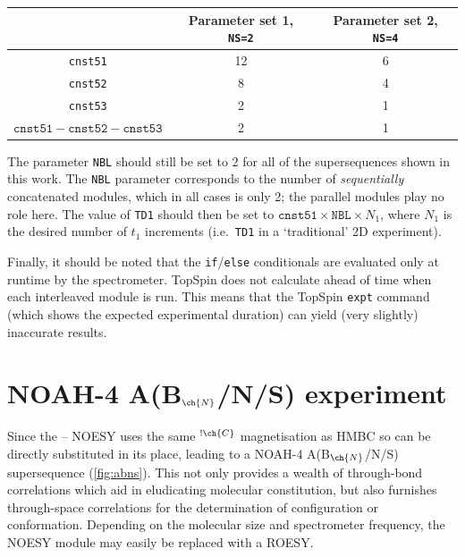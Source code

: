 \documentclass[a4paper,12pt]{article}
\newcommand{\proton}{\ch{^{1}H}}
\newcommand{\carbon}{\ch{^{13}C}}
\newcommand{\magnnot}[1]{\ch{^1H}$^{!#1}$}
\newcommand{\abnns}{NOAH-4 A(B$_{\ch{N}}$/N/S)}
\begin{document}
\begin{refsection}
\begin{table}[H]
    \centering
    \begin{tabular}{ccc}
        \toprule
         & Parameter set 1, \texttt{NS=2} & Parameter set 2, \texttt{NS=4} \\
        \midrule
        \texttt{cnst51} & 12 & 6 \\
        \texttt{cnst52} & 8  & 4 \\
        \texttt{cnst53} & 2  & 1 \\
        $\texttt{cnst51} - \texttt{cnst52} - \texttt{cnst53}$ & 2  & 1 \\
        \bottomrule
    \end{tabular}
\end{table}

The parameter \texttt{NBL} should still be set to 2 for all of the supersequences shown in this work.
The \texttt{NBL} parameter corresponds to the number of \textit{sequentially} concatenated modules, which in all cases is only 2; the parallel modules play no role here.
The value of \texttt{TD1} should then be set to $\texttt{cnst51} \times \texttt{NBL} \times N_1$, where $N_1$ is the desired number of $t_1$ increments (i.e.\ \texttt{TD1} in a `traditional' 2D experiment).

Finally, it should be noted that the \texttt{if}/\texttt{else} conditionals are evaluated only at runtime by the spectrometer.
TopSpin does not calculate ahead of time when each interleaved module is run.
This means that the TopSpin \texttt{expt} command (which shows the expected experimental duration) can yield (very slightly) inaccurate results.

\clearpage

\section{\texorpdfstring{\abnns{}}{NOAH-4 A(Bn/N/S)} experiment}

Since the \proton{}--\proton{} NOESY uses the same \magnnot{\ch{C}} magnetisation as \carbon{} HMBC so can be directly substituted in its place, leading to a \abnns{} supersequence (\cref{fig:abns}).
This not only provides a wealth of through-bond correlations which aid in eludicating molecular constitution, but also furnishes through-space correlations for the determination of configuration or conformation.
Depending on the molecular size and spectrometer frequency, the NOESY module may easily be replaced with a ROESY.


\end{refsection}
\end{document}
